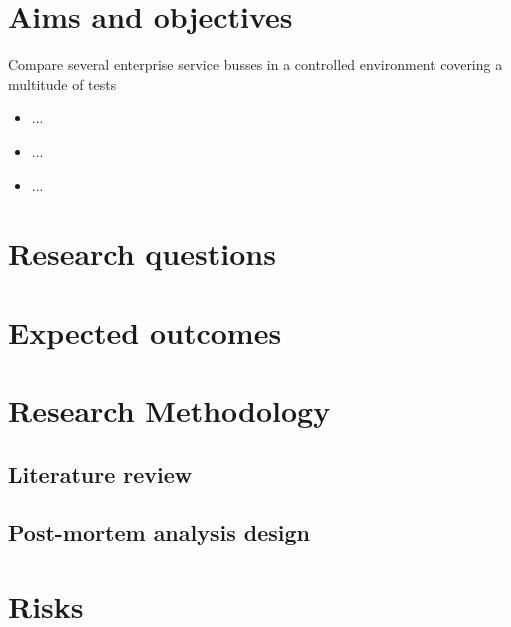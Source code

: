 \documentclass[10pt,a4paper]{proposal}
\begin{document}
\section*{Aims and objectives}
Compare several enterprise service busses in a controlled environment covering a multitude of tests 

\begin{itemize}
\item ...
\item ...
\item ...
\end{itemize}


\section*{Research questions}


\section*{Expected outcomes}


\section*{Research Methodology}

	\subsection{Literature review}

	\subsection{Post-mortem analysis design}


\section*{Risks}
\end{document}
